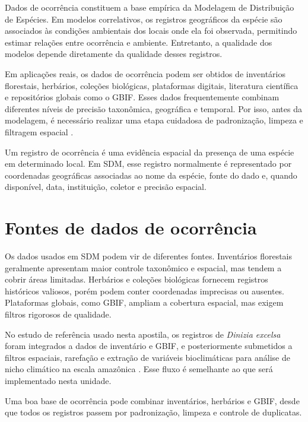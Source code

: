 \documentclass{ueap-sdm}
\begin{document}
Dados de ocorrência constituem a base empírica da Modelagem de Distribuição de Espécies. Em modelos correlativos, os registros geográficos da espécie são associados às condições ambientais dos locais onde ela foi observada, permitindo estimar relações entre ocorrência e ambiente. Entretanto, a qualidade dos modelos depende diretamente da qualidade desses registros.

Em aplicações reais, os dados de ocorrência podem ser obtidos de inventários florestais, herbários, coleções biológicas, plataformas digitais, literatura científica e repositórios globais como o GBIF. Esses dados frequentemente combinam diferentes níveis de precisão taxonômica, geográfica e temporal. Por isso, antes da modelagem, é necessário realizar uma etapa cuidadosa de padronização, limpeza e filtragem espacial \parencite{guisan2017habitat,hijmans2021species,zizka2019coordinatecleaner}.

\begin{conceito}[title={\faBook\quad Registro de ocorrência}]
	Um registro de ocorrência é uma evidência espacial da presença de uma espécie em determinado local. Em SDM, esse registro normalmente é representado por coordenadas geográficas associadas ao nome da espécie, fonte do dado e, quando disponível, data, instituição, coletor e precisão espacial.
\end{conceito}

\section{Fontes de dados de ocorrência}

Os dados usados em SDM podem vir de diferentes fontes. Inventários florestais geralmente apresentam maior controle taxonômico e espacial, mas tendem a cobrir áreas limitadas. Herbários e coleções biológicas fornecem registros históricos valiosos, porém podem conter coordenadas imprecisas ou ausentes. Plataformas globais, como GBIF, ampliam a cobertura espacial, mas exigem filtros rigorosos de qualidade.

No estudo de referência usado nesta apostila, os registros de \textit{Dinizia excelsa} foram integrados a dados de inventário e GBIF, e posteriormente submetidos a filtros espaciais, rarefação e extração de variáveis bioclimáticas para análise de nicho climático na escala amazônica \parencite{delima2026warmer}. Esse fluxo é semelhante ao que será implementado nesta unidade.

\begin{dica}[title={\faLightbulb\quad Integração de fontes}]
	Uma boa base de ocorrência pode combinar inventários, herbários e GBIF, desde que todos os registros passem por padronização, limpeza e controle de duplicatas.
\end{dica}
\end{document}
